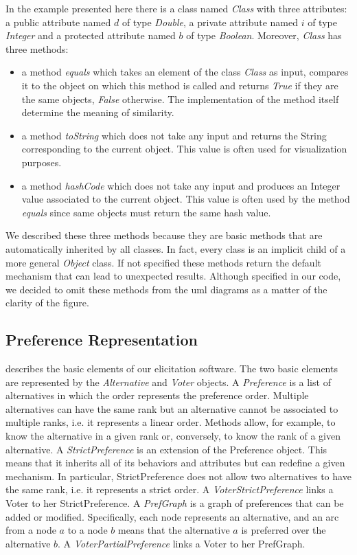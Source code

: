 In the example presented here there is a class named \textit{Class} with three attributes: a public attribute named $d$ of type \textit{Double}, a private attribute named $i$ of type \textit{Integer} and a protected attribute named $b$ of type \textit{Boolean}. Moreover, \textit{Class} has three methods:
\begin{itemize}[noitemsep]
	\item a method \textit{equals} which takes an element of the class \textit{Class} as input, compares it to the object on which this method is called and returns \textit{True} if they are the same objects, \textit{False} otherwise. The implementation of the method itself determine the meaning of similarity.
	\item a method \textit{toString} which does not take any input and returns the String corresponding to the current object. This value is often used for visualization purposes.
	\item a method \textit{hashCode} which does not take any input and produces an Integer value associated to the current object. This value is often used by the method \textit{equals} since same objects must return the same hash value. 
\end{itemize}

We described these three methods because they are basic methods that are automatically inherited by all classes. In fact, every class is an implicit child of a more general \textit{Object} class. If not specified these methods return the default mechanism that can lead to unexpected results. Although specified in our code, we decided to omit these methods from the uml diagrams as a matter of the clarity of the figure.

\subsection{Preference Representation}

 describes the basic elements of our elicitation software.
The two basic elements are represented by the \textit{Alternative} and \textit{Voter} objects. A \textit{Preference} is a list of alternatives in which the order represents the preference order. Multiple alternatives can have the same rank but an alternative cannot be associated to multiple ranks, i.e. it represents a linear order. Methods allow, for example, to know the alternative in a given rank or, conversely, to know the rank of a given alternative.
A \textit{StrictPreference} is an extension of the Preference object. This means that it inherits all of its behaviors and attributes but can redefine a given mechanism. In particular, StrictPreference does not allow two alternatives to have the same rank, i.e. it represents a strict order.
A \textit{VoterStrictPreference} links a Voter to her StrictPreference.
A \textit{PrefGraph} is a graph of preferences that can be added or modified. Specifically, each node represents an alternative, and an arc from a node $a$ to a node $b$ means that the alternative $a$ is preferred over the alternative $b$.
A \textit{VoterPartialPreference} links a Voter to her PrefGraph.

